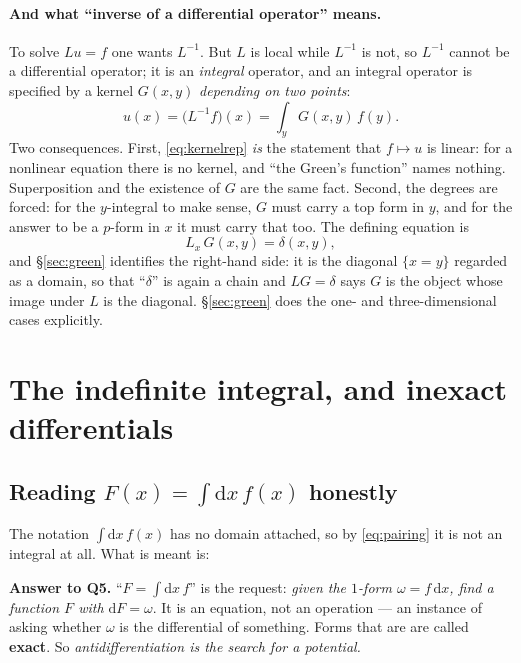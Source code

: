 \documentclass[10pt,a4paper]{article}
\newcommand{\dd}{\mathrm{d}}
\theoremstyle{plain}
\theoremstyle{definition}
\numberwithin{equation}{section}
\begin{document}
\paragraph{And what ``inverse of a differential operator'' means.} To solve $Lu=f$ one wants
$L^{-1}$. But $L$ is local while $L^{-1}$ is not, so $L^{-1}$ cannot be a differential
operator; it is an \emph{integral} operator, and an integral operator is specified by a kernel
$G(x,y)$ \emph{depending on two points}:
\begin{equation}
u(x)=\big(L^{-1}f\big)(x)=\int_{y}G(x,y)\,f(y) .
\label{eq:kernelrep}
\end{equation}
Two consequences. First, \eqref{eq:kernelrep} \emph{is} the statement that $f\mapsto u$ is
linear: for a nonlinear equation there is no kernel, and ``the Green's function'' names nothing.
Superposition and the existence of $G$ are the same fact. Second, the degrees are forced: for
the $y$-integral to make sense, $G$ must carry a top form in $y$, and for the answer to be a
$p$-form in $x$ it must carry that too. The defining equation is
\begin{equation}
L_x\,G(x,y)=\delta(x,y),
\end{equation}
and \S\ref{sec:green} identifies the right-hand side: it is the diagonal $\{x=y\}$ regarded as a
domain, so that ``$\delta$'' is again a chain and $LG=\delta$ says $G$ is the object whose image
under $L$ is the diagonal. \S\ref{sec:green} does the one- and three-dimensional cases
explicitly.


\section{The indefinite integral, and inexact differentials}
\label{sec:exact}

\subsection{Reading $F(x)=\int\dd x\,f(x)$ honestly}

The notation $\int\dd x\,f(x)$ has no domain attached, so by \eqref{eq:pairing} it is not an
integral at all. What is meant is:

\begin{keybox}
\textbf{Answer to Q5.} ``$F=\int\dd x\,f$'' is the request: \emph{given the $1$-form
$\omega=f\,\dd x$, find a function $F$ with $\dd F=\omega$}. It is an equation, not an
operation --- an instance of asking whether $\omega$ is the differential of something. Forms
that are are called \textbf{exact}. So \emph{antidifferentiation is the search for a potential.}
\label{eq:antider}
\end{keybox}
\end{document}
